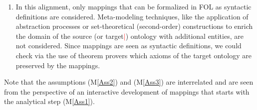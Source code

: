 \documentclass[ao]{iosart2x}
\newcommand{\nb}[1]{\textcolor{red}{$|$}\marginpar{\hspace*{-0cm}\parbox{20mm}{\scriptsize\raggedright\textcolor{red}{#1}}}}
\begin{document}
\begin{enumerate}[({\bf M}1)]
\item \label{Ass3} In this alignment, only mappings that can be formalized in FOL as syntactic definitions are considered. %
Meta-modeling techniques, like the application of abstraction processes or set-theoretical (second-order) constructions to enrich the domain of the source (or target\nb{SB: ho aggiunto, ci sta?}) ontology with additional entities, are not considered. %
Since mappings are seen as syntactic definitions, we could check via the use of theorem provers which axioms of the target ontology are preserved by the mappings.%
\end{enumerate}

Note that the assumptions (M\ref{Ass2}) and (M\ref{Ass3}) are interrelated and are seen from the perspective of an interactive development of mappings that starts with the analytical step (M\ref{Ass1}). 
\end{document}
